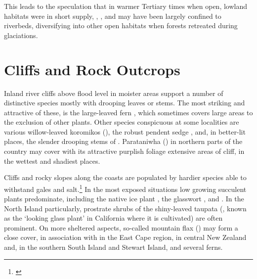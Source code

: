 This leads to the speculation that in warmer Tertiary times when open, lowland habitats were in short supply, , , and  may have been largely confined to riverbeds, diversifying into other open habitats when forests retreated during glaciations.

\section{Cliffs and Rock Outcrops}

Inland river cliffs above flood level in moister areas support a number of distinctive species mostly with drooping leaves or stems.
The most striking and attractive of these, is the large-leaved fern , which sometimes covers large areas to the exclusion of other plants.
Other species conspicuous at some localities are various willow-leaved koromikos (), the robust pendent sedge , and, in better-lit places, the slender drooping stems of .
Parataniwha () in northern parts of the country may cover with its attractive purplish foliage extensive areas of cliff, in the wettest and shadiest places.

Cliffs and rocky slopes along the coasts are populated by hardier species able to withstand gales and salt.\footnote{\cite{moore1963plants}}
In the most exposed situations low growing succulent plants predominate, including the native ice plant , the glasswort ,  and .
In the North Island particularly, prostrate shrubs of the shiny-leaved taupata (, known as the `looking glass plant' in California where it is cultivated) are often prominent.
On more sheltered aspects, so-called mountain flax () may form a close cover, in association with  in the East Cape region,  in central New Zealand and, in the southern South Island and Stewart Island,  and several ferns.

